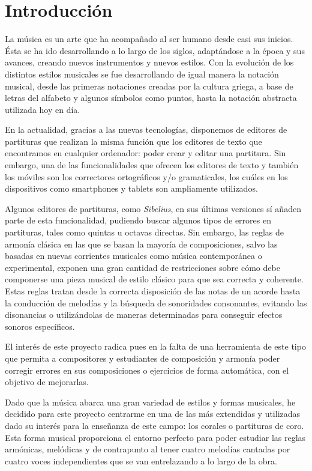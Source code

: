 \chapter*{Introducción}

La música es un arte que ha acompañado al ser humano desde casi sus inicios. Ésta se ha ido desarrollando a lo largo de los siglos, adaptándose a la época y sus avances, creando nuevos instrumentos y nuevos estilos. Con la evolución de los distintos estilos musicales se fue desarrollando de igual manera la notación musical, desde las primeras notaciones creadas por la cultura griega, a base de letras del alfabeto y algunos símbolos como puntos, hasta la notación abstracta utilizada hoy en día. 

En la actualidad, gracias a las nuevas tecnologías, disponemos de editores de partituras que realizan la misma función que los editores de texto que encontramos en cualquier ordenador: poder crear y editar una partitura. Sin embargo, una de las funcionalidades que ofrecen los editores de texto y también los móviles son los correctores ortográficos y/o gramaticales, los cuáles en los dispositivos como smartphones y tablets son ampliamente utilizados. 

Algunos editores de partituras, como \textit{Sibelius}, en sus últimas versiones sí añaden parte de esta funcionalidad, pudiendo buscar algunos tipos de errores en partituras, tales como quintas u octavas directas. Sin embargo, las reglas de armonía clásica en las que se basan la mayoría de composiciones, salvo las basadas en nuevas corrientes musicales como música contemporánea o experimental, exponen una gran cantidad de restricciones sobre cómo debe componerse una pieza musical de estilo clásico para que sea correcta y coherente.  Estas reglas tratan desde la correcta disposición de las notas de un acorde hasta la conducción de melodías y la búsqueda de sonoridades consonantes, evitando las disonancias o utilizándolas de maneras determinadas para conseguir efectos sonoros específicos. 

El interés de este proyecto radica pues en la falta de una herramienta de este tipo que permita a compositores y estudiantes de composición y armonía poder corregir errores en sus composiciones o ejercicios de forma automática, con el objetivo de mejorarlas.

Dado que la música abarca una gran variedad de estilos y formas musicales, he decidido para este proyecto centrarme en una de las más extendidas y utilizadas dado su interés para la enseñanza de este campo: los corales o partituras de coro. Esta forma musical proporciona el entorno perfecto para poder estudiar las reglas armónicas, melódicas y de contrapunto al tener cuatro melodías cantadas por cuatro voces independientes que se van entrelazando a lo largo de la obra. 

